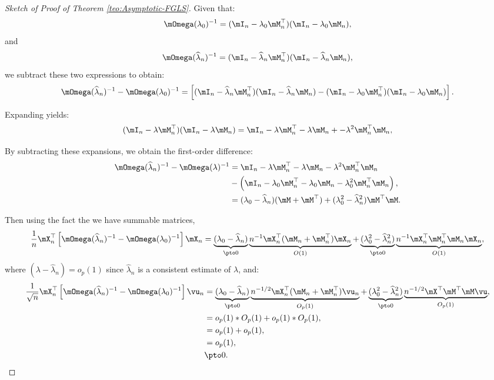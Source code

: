 \documentclass[english,12pt]{book}\usepackage[]{graphicx}\usepackage[]{xcolor}
\begin{document}
\begin{proof}[Sketch of Proof of Theorem \ref{teo:Asymptotic-FGLS}]
Given that:
\[
\mOmega(\lambda_0)^{-1} = (\mI_n - \lambda_0\mM_n^\top)(\mI_n - \lambda_0 \mM_n),
\]
%
and
\[
\mOmega(\widehat{\lambda}_n)^{-1} = (\mI_n - \widehat{\lambda}_n \mM_n^\top)(\mI_n - \widehat{\lambda}_n \mM_n),
\]
%
we subtract these two expressions to obtain:
\[
\mOmega(\widehat{\lambda}_n)^{-1} - \mOmega(\lambda_0)^{-1} = \left[ (\mI_n - \widehat{\lambda}_n \mM_n^\top)(\mI_n - \widehat{\lambda}_n \mM_n) - (\mI_n - \lambda_0\mM_n^\top)(\mI_n - \lambda_0\mM_n) \right].
\]

Expanding yields:
\[
(\mI_n - \lambda \mM_n^\top)(\mI_n - \lambda \mM_n) = \mI_n - \lambda \mM_n^\top - \lambda \mM_n +-\lambda^2\mM_n^\top\mM_n,
\]

By subtracting these expansions, we obtain the first-order difference:
\begin{equation*}
\begin{aligned}
\mOmega(\widehat{\lambda}_n)^{-1} - \mOmega(\lambda)^{-1} & =  \mI_n - \lambda \mM_n^\top - \lambda \mM_n-\lambda^2\mM_n^\top\mM_n  \\
& - \left(\mI_n - \lambda_0 \mM_n^\top - \lambda_0 \mM_n -\lambda^2_0\mM_n^\top\mM_n\right), \\
& = (\lambda_0 - \widehat{\lambda}_n)(\mM + \mM^\top) + (\lambda^2_0 - \widehat{\lambda}_n^2)\mM^\top\mM.
\end{aligned}
\end{equation*}

Then using the fact the we have summable matrices, 
\begin{equation*}
  \frac{1}{n}\mX^\top_n\left[\mOmega(\widehat{\lambda}_n)^{-1}- \mOmega(\lambda_0)^{-1}\right]\mX_n = \underbrace{(\lambda_0 - \widehat{\lambda}_n)}_{\pto 0}\underbrace{n^{-1}\mX^\top_n(\mM_n + \mM^\top_n)\mX_n}_{O(1)} + \underbrace{(\lambda^2_0 - \widehat{\lambda}_n^2)}_{\pto 0}\underbrace{n^{-1}\mX^\top_n\mM^\top_n\mM_n\mX_n}_{O(1)},
\end{equation*}
%
where $(\lambda - \widehat{\lambda}_n)=o_p(1)$ since $\widehat{\lambda}_n$ is a consistent estimate of $\lambda$, and:
\begin{equation}
  \begin{aligned}
  \frac{1}{\sqrt{n}}\mX^\top_n\left[\mOmega(\widehat{\lambda}_n)^{-1}- \mOmega(\lambda_0)^{-1}\right]\vu_n & = \underbrace{(\lambda_0 - \widehat{\lambda}_n)}_{\pto 0}\underbrace{n^{-1/2}\mX^\top_n(\mM_n + \mM^\top_n)\vu_n}_{O_p(1)} + \underbrace{(\lambda^2_0 - \widehat{\lambda}_n^2)}_{\pto 0}\underbrace{n^{-1/2}\mX^\top\mM^\top\mM\vu}_{O_p(1)}, \\
  & =  o_p(1)*O_p(1) + o_p(1)*O_p(1), \\
  & = o_p(1) + o_p(1), \\
  & = o_p(1), \\
  & \pto 0.
  \end{aligned}
\end{equation}


\end{proof}
\end{document}
